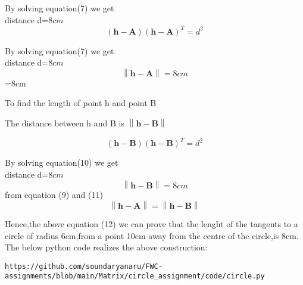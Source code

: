 \documentclass[journal,10pt,twocolumn]{article}
\providecommand{\norm}[1]{\left\lVert#1\right\rVert}
\let\vec\mathbf
\begin{document}
\begin{center}
	By solving  equation(7) we get \\
	    distance  d=$8cm$\\
	    \begin{equation}
  (\vec{h}-\vec{A})(\vec{h}-\vec{A})^T=d^2
\end{equation}
\end{center}
\begin{center}
	By solving  equation(7) we get \\
	    distance  d=$8cm$\\
	    \begin{equation}
	    \norm{\vec{h}-\vec{A}}=8cm
	    \end{equation}=8cm
\end{center}
To find the length of point h and point B\\
\begin{center}
	The distance between h and B is $\norm{\vec{h}-\vec{B}}$\\
\end{center}
\begin{equation}
  (\vec{h}-\vec{B})(\vec{h}-\vec{B})^T=d^2
\end{equation}
\begin{center}
	By solving  equation(10) we get \\
	    distance  d=$8cm$\\
	    \begin{equation}
	    \norm{\vec{h}-\vec{B}}=8cm
	    \end{equation}
	    from equation (9) and (11)\\
	    \begin{equation}
	    \norm{\vec{h}-\vec{A}}=\norm{\vec{h}-\vec{B}}
	    \end{equation}
	    \end{center}
	    Hence,the above equation (12) we can prove that the lenght of the tangents to a circle of radius 6cm,from a point 10cm away from the centre of the circle,is 8cm.\\
	    
	    
The below python code realizes the above construction:	\\
\begin{lstlisting}
https://github.com/soundaryanaru/FWC-assignments/blob/main/Matrix/circle_assignment/code/circle.py
\end{lstlisting}

\end{document}
